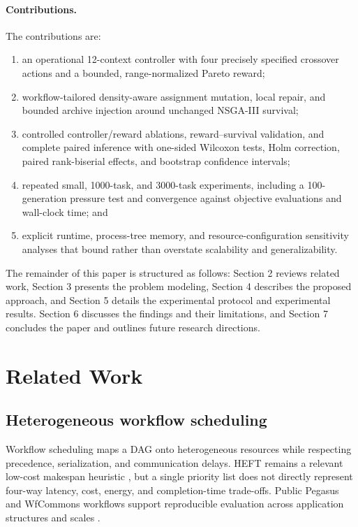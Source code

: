 \documentclass[preprint,12pt]{elsarticle}
\begin{document}
\paragraph{Contributions.}
The contributions are:
\begin{enumerate}
    \item an operational 12-context controller with four precisely specified crossover actions and a bounded, range-normalized Pareto reward;
    \item workflow-tailored density-aware assignment mutation, local repair, and bounded archive injection around unchanged NSGA-III survival;
    \item controlled controller/reward ablations, reward--survival validation, and complete paired inference with one-sided Wilcoxon tests, Holm correction, paired rank-biserial effects, and bootstrap confidence intervals;
    \item repeated small, 1000-task, and 3000-task experiments, including a 100-generation pressure test and convergence against objective evaluations and wall-clock time; and
    \item explicit runtime, process-tree memory, and resource-configuration sensitivity analyses that bound rather than overstate scalability and generalizability.
\end{enumerate}

The remainder of this paper is structured as follows: Section 2 reviews related work, Section 3 presents the problem modeling, Section 4 describes the proposed approach, and Section 5 details the experimental protocol and experimental results. Section 6 discusses the findings and their limitations, and Section 7 concludes the paper and outlines future research directions.

\section{Related Work}
\subsection{Heterogeneous workflow scheduling}
Workflow scheduling maps a DAG onto heterogeneous resources while respecting precedence, serialization, and communication delays. HEFT remains a relevant low-cost makespan heuristic \cite{topcuoglu2002heft}, but a single priority list does not directly represent four-way latency, cost, energy, and completion-time trade-offs. Public Pegasus and WfCommons workflows support reproducible evaluation across application structures and scales \cite{pegasus,coleman2021wfcommons}.
\end{document}

